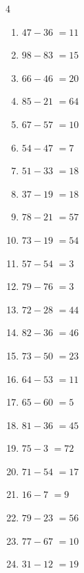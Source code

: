 \begin{multicols}{4}
\begin{enumerate}
  \item $47-36$
        $=11$

  \item $98-83$
        $=15$

  \item $66-46$
        $=20$

  \item $85-21$
        $=64$

  \item $67-57$
        $=10$

  \item $54-47$
        $=7$

  \item $51-33$
        $=18$

  \item $37-19$
        $=18$

  \item $78-21$
        $=57$

  \item $73-19$
        $=54$

  \item $57-54$
        $=3$

  \item $79-76$
        $=3$

  \item $72-28$
        $=44$

  \item $82-36$
        $=46$

  \item $73-50$
        $=23$

  \item $64-53$
        $=11$

  \item $65-60$
        $=5$

  \item $81-36$
        $=45$

  \item $75-3$
        $=72$

  \item $71-54$
        $=17$

  \item $16-7$
        $=9$

  \item $79-23$
        $=56$

  \item $77-67$
        $=10$

  \item $31-12$
        $=19$


\end{enumerate}
\end{multicols}
